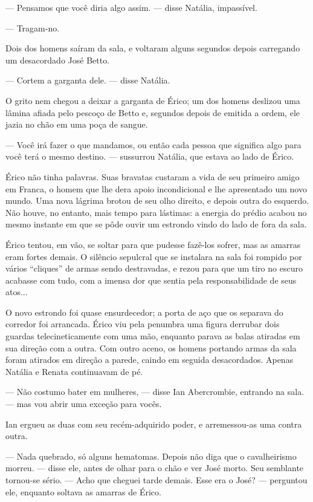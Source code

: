 --- Pensamos que você diria algo assim. --- disse Natália, impassível.

--- Tragam-no.

Dois dos homens saíram da sala, e voltaram alguns segundos depois
carregando um desacordado José Betto.

--- Cortem a garganta dele. --- disse Natália.

O grito nem chegou a deixar a garganta de Érico; um dos homens deslizou
uma lâmina afiada pelo pescoço de Betto e, segundos depois de emitida a
ordem, ele jazia no chão em uma poça de sangue.

--- Você irá fazer o que mandamos, ou então cada pessoa que significa
algo para você terá o mesmo destino. --- sussurrou Natália, que estava
ao lado de Érico.

Érico não tinha palavras. Suas bravatas custaram a vida de seu primeiro
amigo em Franca, o homem que lhe dera apoio incondicional e lhe
apresentado um novo mundo. Uma nova lágrima brotou de seu olho direito,
e depois outra do esquerdo. Não houve, no entanto, mais tempo para
lástimas: a energia do prédio acabou no mesmo instante em que se pôde
ouvir um estrondo vindo do lado de fora da sala.

Érico tentou, em vão, se soltar para que pudesse fazê-los sofrer, mas as
amarras eram fortes demais. O silêncio sepulcral que se instalara na
sala foi rompido por vários “cliques” de armas sendo destravadas, e
rezou para que um tiro no escuro acabasse com tudo, com a imensa dor que
sentia pela responsabilidade de seus atos...

O novo estrondo foi quase ensurdecedor; a porta de aço que os separava
do corredor foi arrancada. Érico viu pela penumbra uma figura derrubar
  dois guardas telecineticamente com uma mão, enquanto parava as balas
  atiradas em sua direção com a outra. Com outro aceno, os homens
  portando armas da sala foram atirados em direção a parede, caindo em
  seguida desacordados. Apenas Natália e Renata continuavam de pé.

--- Não costumo bater em mulheres, --- disse Ian Abercrombie, entrando
na sala. --- mas vou abrir uma exceção para vocês.

Ian ergueu as duas com seu recém-adquirido poder, e arremessou-as uma
contra outra.

--- Nada quebrado, só alguns hematomas. Depois não diga que o
cavalheirismo morreu. --- disse ele, antes de olhar para o chão e ver
José morto. Seu semblante tornou-se sério. --- Acho que cheguei tarde
demais. Esse era o José? --- perguntou ele, enquanto soltava as amarras
de Érico.

